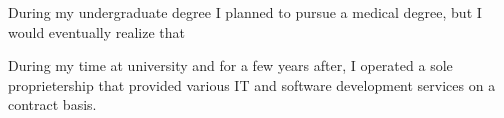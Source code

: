 \begin{cvletter}

	During my undergraduate degree I planned to pursue a medical degree,
	but I would eventually realize that

	During my time at university and for a few years after, I operated a
	sole proprietership that provided various IT and software development
	services on a contract basis.

\end{cvletter}
